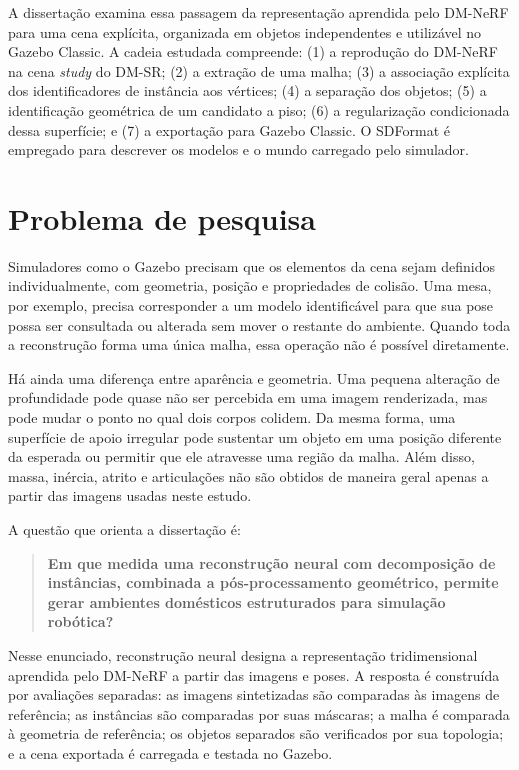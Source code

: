 A dissertação examina essa passagem da representação aprendida pelo DM-NeRF para uma cena explícita, organizada em objetos independentes e utilizável no Gazebo Classic. A cadeia estudada compreende: (1) a reprodução do DM-NeRF na cena \textit{study} do DM-SR; (2) a extração de uma malha; (3) a associação explícita dos identificadores de instância aos vértices; (4) a separação dos objetos; (5) a identificação geométrica de um candidato a piso; (6) a regularização condicionada dessa superfície; e (7) a exportação para Gazebo Classic. O SDFormat é empregado para descrever os modelos e o mundo carregado pelo simulador.

\section{Problema de pesquisa}

Simuladores como o Gazebo precisam que os elementos da cena sejam definidos individualmente, com geometria, posição e propriedades de colisão. Uma mesa, por exemplo, precisa corresponder a um modelo identificável para que sua pose possa ser consultada ou alterada sem mover o restante do ambiente. Quando toda a reconstrução forma uma única malha, essa operação não é possível diretamente.

Há ainda uma diferença entre aparência e geometria. Uma pequena alteração de profundidade pode quase não ser percebida em uma imagem renderizada, mas pode mudar o ponto no qual dois corpos colidem. Da mesma forma, uma superfície de apoio irregular pode sustentar um objeto em uma posição diferente da esperada ou permitir que ele atravesse uma região da malha. Além disso, massa, inércia, atrito e articulações não são obtidos de maneira geral apenas a partir das imagens usadas neste estudo.

A questão que orienta a dissertação é:

\begin{quote}
\textbf{Em que medida uma reconstrução neural com decomposição de instâncias, combinada a pós-processamento geométrico, permite gerar ambientes domésticos estruturados para simulação robótica?}
\end{quote}

Nesse enunciado, reconstrução neural designa a representação tridimensional aprendida pelo DM-NeRF a partir das imagens e poses. A resposta é construída por avaliações separadas: as imagens sintetizadas são comparadas às imagens de referência; as instâncias são comparadas por suas máscaras; a malha é comparada à geometria de referência; os objetos separados são verificados por sua topologia; e a cena exportada é carregada e testada no Gazebo.

